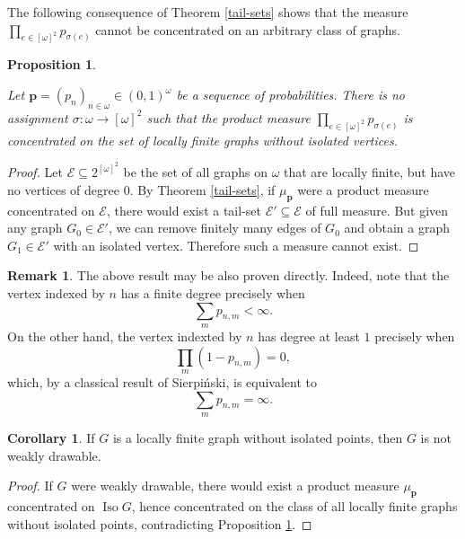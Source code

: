 \documentclass{amsart}
\newtheorem{prop}[theorem]{Proposition}
\theoremstyle{plain}
\theoremstyle{definition}
\newtheorem{cor}[theorem]{Corollary}
\newtheorem{rem}[theorem]{Remark}
\theoremstyle{remark}
\numberwithin{equation}{section}
\newcommand{\mc}{\mathcal}
\DeclareMathOperator{\iso}{Iso}
\newcommand{\s}{\subseteq}
\begin{document}
The following consequence of Theorem \ref{tail-sets} shows that the measure $\prod\limits_{e \in [\omega]^2}p_{\sigma(e)}$ cannot be concentrated on an arbitrary class of graphs.

\begin{prop}\label{Prop stopnie wieksze niz zero ale skonczone}

    Let $\textbf{p}=(p_{n})_{n\in\omega}\in(0,1)^\omega$ be a sequence of probabilities.
    There is no assignment $\sigma:\omega \rightarrow [\omega]^2$ such that
    the product measure $\prod\limits_{e \in [\omega]^2}p_{\sigma(e)}$ is concentrated on the set of locally finite graphs without isolated vertices.
    \end{prop}
    
\begin{proof} 
    Let $\mathcal E \s 2^{[\omega]^2}$ be the set of all graphs on $\omega$ that are locally finite, but have no vertices of degree $0$. By Theorem \ref{tail-sets}, if $\mu_\mathbf{p}$ were a product measure concentrated on $\mc{E}$, there would exist a tail-set $\mc{E}'\s \mc{E}$ of full measure. But given any graph $G_0 \in \mc{E'}$, we can remove finitely many edges of $G_0$ and obtain a graph $G_1\in\mc{E'}$ with an isolated vertex. Therefore such a measure cannot exist.
\end{proof}
\begin{rem}
    The above result may be also proven directly. Indeed,     note that the vertex indexed by $n$ has a finite degree precisely when
    $$\sum\limits_{m} p_{n,m} < \infty.$$
    On the other hand, the vertex indexted by $n$ has degree at least $1$ precisely when
    $$\prod\limits_{m} (1-p_{n,m}) =0,$$
    which, by a classical result of Sierpi\'nski, is
    equivalent to 
    $$\sum\limits_{m} p_{n,m}=\infty.$$

\end{rem}

\begin{cor}
    If $G$ is a locally finite graph without isolated points, then $G$ is not weakly drawable.
\end{cor}
\begin{proof}
    If $G$ were weakly drawable, there would exist a product measure $\mu_\mathbf{p}$ concentrated on $\iso{G}$, hence concentrated on the class of all locally finite graphs without isolated points, contradicting Proposition \ref{Prop stopnie wieksze niz zero ale skonczone}.
\end{proof}
\end{document}
